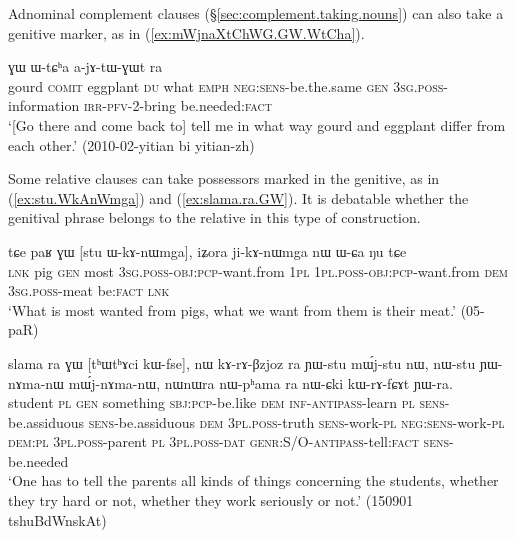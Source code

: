 Adnominal complement clauses (§\ref{sec:complement.taking.nouns}) can also take a genitive marker, as in (\ref{ex:mWjnaXtChWG.GW.WtCha}).

\begin{exe}
\ex \label{ex:mWjnaXtChWG.GW.WtCha}
 ɣɯ ɯ-tɕʰa a-jɤ-tɯ-ɣɯt ra \\
gourd \textsc{comit} eggplant \textsc{du} what \textsc{emph} \textsc{neg}:\textsc{sens}-be.the.same \textsc{gen} \textsc{3sg}.\textsc{poss}-information \textsc{irr}-\textsc{pfv}-2-bring be.needed:\textsc{fact} \\
\glt `[Go there and come back to] tell me in what way gourd and eggplant differ from each other.' (2010-02-yitian bi yitian-zh)
\end{exe}

Some relative clauses can take possessors marked in the genitive, as in  (\ref{ex:stu.WkAnWmga}) and (\ref{ex:slama.ra.GW}). It is debatable whether the genitival phrase belongs to the relative in this type of construction.

\begin{exe}
\ex \label{ex:stu.WkAnWmga}
 \gll tɕe paʁ ɣɯ [stu ɯ-kɤ-nɯmga], iʑora ji-kɤ-nɯmga nɯ ɯ-ɕa ŋu tɕe \\
 \textsc{lnk} pig \textsc{gen} most \textsc{3sg}.\textsc{poss}-\textsc{obj}:\textsc{pcp}-want.from \textsc{1pl} \textsc{1pl}.\textsc{poss}-\textsc{obj}:\textsc{pcp}-want.from \textsc{dem} \textsc{3sg}.\textsc{poss}-meat be:\textsc{fact} \textsc{lnk} \\
\glt  `What is most wanted from pigs, what we want from them is their meat.' (05-paR)
\end{exe}

\begin{exe}
\ex \label{ex:slama.ra.GW}
\gll  slama ra ɣɯ [tʰɯtʰɤci kɯ-fse], nɯ kɤ-rɤ-βzjoz ra ɲɯ-stu mɯ́j-stu nɯ, nɯ-stu ɲɯ-nɤma-nɯ mɯ́j-nɤma-nɯ,  nɯnɯra nɯ-pʰama ra nɯ-ɕki kɯ-rɤ-fɕɤt ɲɯ-ra. \\
student \textsc{pl} \textsc{gen} something \textsc{sbj}:\textsc{pcp}-be.like \textsc{dem}  \textsc{inf}-\textsc{antipass}-learn \textsc{pl} \textsc{sens}-be.assiduous \textsc{sens}-be.assiduous \textsc{dem} \textsc{3pl}.\textsc{poss}-truth \textsc{sens}-work-\textsc{pl} \textsc{neg}:\textsc{sens}-work-\textsc{pl} \textsc{dem}:\textsc{pl} \textsc{3pl}.\textsc{poss}-parent \textsc{pl} \textsc{3pl}.\textsc{poss}-\textsc{dat} \textsc{genr}:S/O-\textsc{antipass}-tell:\textsc{fact} \textsc{sens}-be.needed \\
\glt `One has to tell the parents all kinds of things concerning the students, whether they try hard or not, whether they work seriously or not.' (150901 tshuBdWnskAt)
\end{exe}

